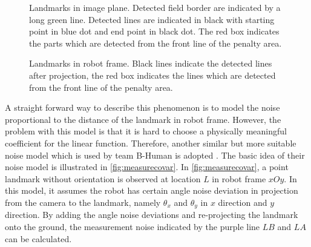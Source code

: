 \begin{figure}[h!]
  \centering
{}
\caption[Landmarks in image plane]{Landmarks in image plane. Detected field border are indicated by a long green line. Detected lines are indicated in black with starting point in blue dot and end point in black dot. The red box indicates the parts which are detected from the front line of the penalty area.}
  \label{fig:landmarkImagePlane}
\end{figure}


\begin{figure}[h!]
  \centering
{}
\caption[Landmarks in robot frame]{Landmarks in robot frame. Black lines indicate the detected lines after projection, the red box indicates the lines which are detected from the front line of the penalty area.}
  \label{fig:landmarkRobotFrame}
\end{figure}

A straight forward way to describe this phenomenon is to model the noise proportional to the distance of the landmark in robot frame. However, the problem with this model is that it is hard to choose a physically meaningful coefficient for the linear function. Therefore, another similar but more suitable noise model which is used by team B-Human is adopted \cite{Bhuman}. The basic idea of their noise model is illustrated in \autoref{fig:measurecovar}. In \autoref{fig:measurecovar}, a point landmark without orientation is observed at location $L$ in robot frame $xOy$. In this model, it assumes the robot has certain angle noise deviation in projection from the camera to the landmark, namely $\theta_{x}$ and $\theta_{y}$ in $x$ direction and $y$ direction. By adding the angle noise deviations and re-projecting the landmark onto the ground, the measurement noise indicated by the purple line $LB$ and $LA$ can be calculated. 

